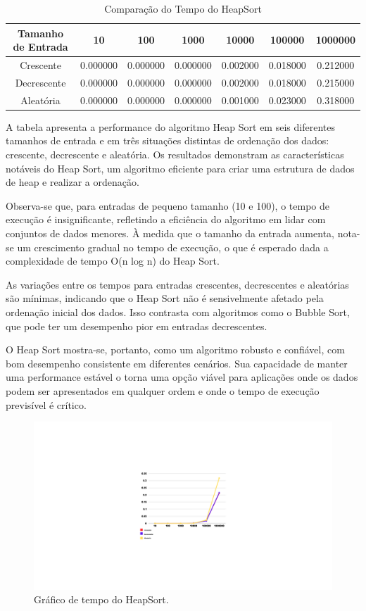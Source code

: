 \begin{table}[h]
    \centering
    \caption{Comparação do Tempo do HeapSort}
    \begin{tabular}{|c|c|c|c|c|c|c|}
        \hline
        Tamanho de Entrada & 10 & 100 & 1000 & 10000 & 100000 & 1000000 \\
        \hline
        Crescente & 0.000000 & 0.000000 & 0.000000 & 0.002000 & 0.018000 & 0.212000 \\
        \hline
        Decrescente & 0.000000 & 0.000000 & 0.000000 & 0.002000 & 0.018000 & 0.215000 \\
        \hline
        Aleatória & 0.000000 & 0.000000 & 0.000000 & 0.001000 & 0.023000 & 0.318000 \\
        \hline
    \end{tabular}
    \label{tab:comparacaobubble}
\end{table}

A tabela apresenta a performance do algoritmo Heap Sort em seis diferentes tamanhos de entrada e em três situações distintas de ordenação dos dados: crescente, decrescente e aleatória. Os resultados demonstram as características notáveis do Heap Sort, um algoritmo eficiente para criar uma estrutura de dados de heap e realizar a ordenação.

Observa-se que, para entradas de pequeno tamanho (10 e 100), o tempo de execução é insignificante, refletindo a eficiência do algoritmo em lidar com conjuntos de dados menores. À medida que o tamanho da entrada aumenta, nota-se um crescimento gradual no tempo de execução, o que é esperado dada a complexidade de tempo O(n log n) do Heap Sort.

As variações entre os tempos para entradas crescentes, decrescentes e aleatórias são mínimas, indicando que o Heap Sort não é sensivelmente afetado pela ordenação inicial dos dados. Isso contrasta com algoritmos como o Bubble Sort, que pode ter um desempenho pior em entradas decrescentes.

O Heap Sort mostra-se, portanto, como um algoritmo robusto e confiável, com bom desempenho consistente em diferentes cenários. Sua capacidade de manter uma performance estável o torna uma opção viável para aplicações onde os dados podem ser apresentados em qualquer ordem e onde o tempo de execução previsível é crítico.

 \begin{figure}[H]
    \centering
    \includegraphics[width = 20cm]{Imagens/Heap Sort/zz.png}
    \caption{Gráfico de tempo do HeapSort. }
    \label{imagem_digrama}
\end{figure}
